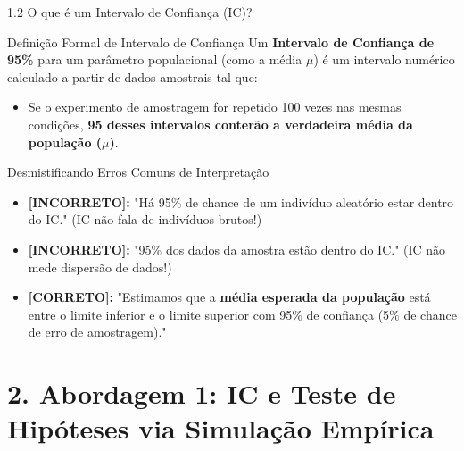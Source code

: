 \documentclass[10pt, aspectratio=169]{beamer}
\begin{document}
\begin{frame}{1.2 O que é um Intervalo de Confiança (IC)?}
    \begin{block}{Definição Formal de Intervalo de Confiança}
        Um 	\textbf{Intervalo de Confiança de 95\%} para um parâmetro populacional (como a média $\mu$) é um intervalo numérico calculado a partir de dados amostrais tal que:
        \begin{itemize}
            \item Se o experimento de amostragem for repetido 100 vezes nas mesmas condições, 	\textbf{95 desses intervalos conterão a verdadeira média da população ($\mu$)}.
        \end{itemize}
    \end{block}

    \vspace{0.2cm}

    \begin{alertblock}{Desmistificando Erros Comuns de Interpretação}
        \begin{itemize}
            \item \textbf{[INCORRETO]:} "Há 95\% de chance de um indivíduo aleatório estar dentro do IC." (IC não fala de indivíduos brutos!)
            \item \textbf{[INCORRETO]:} "95\% dos dados da amostra estão dentro do IC." (IC não mede dispersão de dados!)
            \item \textbf{[CORRETO]:} "Estimamos que a \textbf{média esperada da população} está entre o limite inferior e o limite superior com 95\% de confiança (5\% de chance de erro de amostragem)."
        \end{itemize}
    \end{alertblock}
\end{frame}

\section{2. Abordagem 1: IC e Teste de Hipóteses via Simulação Empírica}
\end{document}
